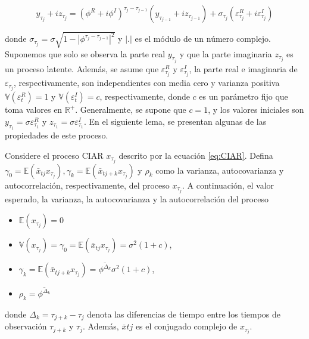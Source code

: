 \begin{equation}
	y_{\tau_{j}}+i z_{\tau_{j}}=\left(\phi^{R}+i \phi^{I}\right)^{\tau_{j}-\tau_{j-1}}\left(y_{\tau_{j-1}}+i z_{\tau_{j-1}}\right)+\sigma_{\tau_{j}}\left(\varepsilon_{\tau_{j}}^{R}+i \varepsilon_{\tau_{j}}^{I}\right)
	\label{eq:CIAR}
\end{equation}

donde $\sigma_{\tau_{j}}=\sigma \sqrt{1-\left|\phi^{\tau_{j}-\tau_{j-1}}\right|^{2}}$ y $|$.$|$ es el módulo de un número complejo. 
Suponemos que solo se observa la parte real $y_{\tau_{j}}$ y que la parte imaginaria $z_{\tau_{j}}$ es un proceso latente. Además, se asume que $\varepsilon_{\tau_{j}}^{R}$ y $\varepsilon_{\tau_{j}}^{I}$, 
la parte real e imaginaria de $\varepsilon_{\tau_{j}}$, respectivamente, son independientes con media cero y varianza positiva $\mathbb{V}\left(\varepsilon_{t}^{R}\right)=1$ y $\mathbb{V}\left(\varepsilon_{t}^{I}\right)=c$, 
respectivamente, donde $c$ es un parámetro fijo que toma valores en $\mathbb{R}^{+}$. Generalmente, se supone que $c=1$, y los valores iniciales son $y_{\tau_{1}}=\sigma \varepsilon_{\tau_{1}}^{R}$ y $z_{\tau_{1}}=\sigma \varepsilon_{\tau_{1}}^{I}$.
En el siguiente lema, se presentan algunas de las propiedades de este proceso.

\begin{lemma}
	Considere el proceso CIAR $x_{\tau_{j}}$ descrito por la ecuación \ref{eq:CIAR}. Defina $\gamma_{0}=\mathbb{E}\left(\bar{x}_{t{j}} x_{\tau_{j}}\right), \gamma_{k}=\mathbb{E}\left(\bar{x}_{t{j+k}} x_{\tau_{j}}\right)$ 
	y $\rho_{k}$ como la varianza, autocovarianza y autocorrelación, respectivamente, del proceso $x_{\tau_{j}}$. A continuación, el valor esperado, la varianza, la autocovarianza y la autocorrelación del proceso 
	\begin{itemize}
		\item $\mathbb{E}\left(x_{\tau_{j}}\right) = 0$
		\item $\mathbb{V}\left(x_{\tau_{j}}\right)=\gamma_{0}=\mathbb{E}\left(\bar{x}_{t{j}} x_{\tau_{j}}\right)=\sigma^{2}(1+c)$,
		\item $\gamma_{k}=\mathbb{E}\left(\bar{x}_{t{j+k}} x_{\tau_{j}}\right)=\overline{\phi^{\Delta_{k}}} \sigma^{2}(1+c)$,
		\item $\rho_{k}=\overline{\phi^{\Delta_{k}}}$
	\end{itemize}
	donde $\Delta_{k}=\tau_{j+k}-\tau_{j}$ denota las diferencias de tiempo entre los tiempos de observación $\tau_{j+k}$ y $\tau_{j}$. Además, 
	$\bar{x}{t{j}}$ es el conjugado complejo de $x_{\tau_{j}}$.
	\label{Lemma1}
\end{lemma}
 
